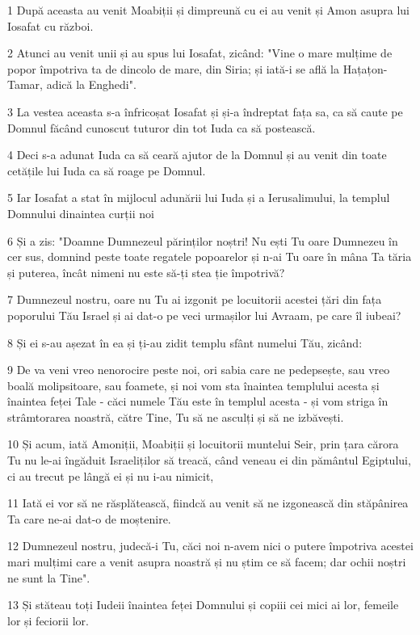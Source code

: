 \par 1 După aceasta au venit Moabiții și dimpreună cu ei au venit și Amon asupra lui Iosafat cu război.
\par 2 Atunci au venit unii și au spus lui Iosafat, zicând: "Vine o mare mulțime de popor împotriva ta de dincolo de mare, din Siria; și iată-i se află la Hațațon-Tamar, adică la Enghedi".
\par 3 La vestea aceasta s-a înfricoșat Iosafat și și-a îndreptat fața sa, ca să caute pe Domnul făcând cunoscut tuturor din tot Iuda ca să postească.
\par 4 Deci s-a adunat Iuda ca să ceară ajutor de la Domnul și au venit din toate cetățile lui Iuda ca să roage pe Domnul.
\par 5 Iar Iosafat a stat în mijlocul adunării lui Iuda și a Ierusalimului, la templul Domnului dinaintea curții noi
\par 6 Și a zis: "Doamne Dumnezeul părinților noștri! Nu ești Tu oare Dumnezeu în cer sus, domnind peste toate regatele popoarelor și n-ai Tu oare în mâna Ta tăria și puterea, încât nimeni nu este să-ți stea ție împotrivă?
\par 7 Dumnezeul nostru, oare nu Tu ai izgonit pe locuitorii acestei țări din fața poporului Tău Israel și ai dat-o pe veci urmașilor lui Avraam, pe care îl iubeai?
\par 8 Și ei s-au așezat în ea și ți-au zidit templu sfânt numelui Tău, zicând:
\par 9 De va veni vreo nenorocire peste noi, ori sabia care ne pedepsește, sau vreo boală molipsitoare, sau foamete, și noi vom sta înaintea templului acesta și înaintea feței Tale - căci numele Tău este în templul acesta - și vom striga în strâmtorarea noastră, către Tine, Tu să ne asculți și să ne izbăvești.
\par 10 Și acum, iată Amoniții, Moabiții și locuitorii muntelui Seir, prin țara cărora Tu nu le-ai îngăduit Israeliților să treacă, când veneau ei din pământul Egiptului, ci au trecut pe lângă ei și nu i-au nimicit,
\par 11 Iată ei vor să ne răsplătească, fiindcă au venit să ne izgonească din stăpânirea Ta care ne-ai dat-o de moștenire.
\par 12 Dumnezeul nostru, judecă-i Tu, căci noi n-avem nici o putere împotriva acestei mari mulțimi care a venit asupra noastră și nu știm ce să facem; dar ochii noștri ne sunt la Tine".
\par 13 Și stăteau toți Iudeii înaintea feței Domnului și copiii cei mici ai lor, femeile lor și feciorii lor.
